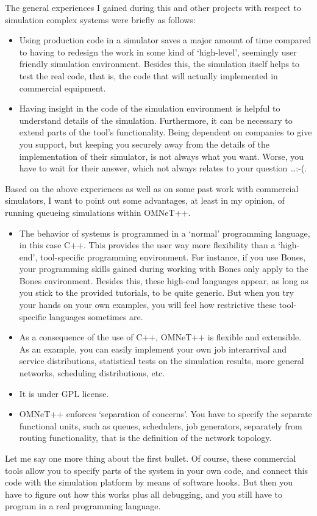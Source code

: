 \documentclass[a4paper]{article}
\begin{document}
The general experiences I gained during this and other projects with
respect to simulation complex systems were briefly as follows:
\begin{itemize}
\item Using production code in a simulator saves a major amount of
  time compared to having to redesign the work in some kind of
  `high-level', seemingly user friendly simulation environment.
  Besides this, the simulation itself helps to test the real code,
  that is, the code that will actually implemented in commercial
  equipment. 
\item Having insight in the code of the simulation environment is
  helpful to understand details of the simulation. Furthermore, it can
  be necessary to extend parts of the tool's functionality. Being
  dependent on companies to give you support, but keeping you securely
  away from the details of the implementation of their simulator, is
  not always what you want. Worse, you have to wait for their answer,
  which not always relates to your question \ldots :-(.
\end{itemize}
Based on the above experiences as well as on some past work with
commercial simulators, I want to point out some advantages, at least
in my opinion, of running queueing simulations within OMNeT++.
\begin{itemize}
\item The behavior of  systems is programmed in a `normal'
  programming language, in this case C++. This provides the user way
  more flexibility than a `high-end', tool-specific programming
  environment. For instance, if you use Bones, your programming skills
  gained during working with Bones only apply to the Bones
  environment. Besides this, these high-end languages appear, as long
  as you stick to the provided tutorials, to be quite generic. But
  when you try your hands on your own examples,  you will feel how
  restrictive these tool-specific languages sometimes  are. 
\item As a consequence of the use of C++, OMNeT++ is flexible and
  extensible. As an example, you can easily implement your own job
  interarrival and service distributions, statistical tests on the
  simulation results, more general networks, scheduling distributions,
  etc.
\item It is under GPL license.
\item OMNeT++ enforces `separation of concerns'. You have to specify
  the separate functional units, such as queues, schedulers, job
  generators, separately from routing functionality, that is the
  definition of the network topology.
\end{itemize}
Let me say one more thing about the first bullet. Of course, these
commercial tools allow you to specify parts of the system in your own
code, and connect this code with the simulation platform by means of
software hooks.  But then you have to figure out how this works plus
all debugging, and you still have to program in a real programming
language. 
\end{document}
